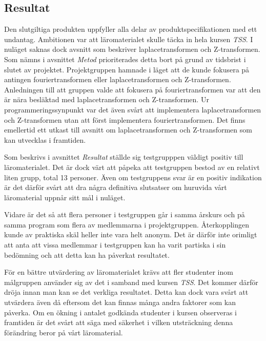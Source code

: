 \documentclass[]{article}
\begin{document}
\subsection{Resultat}
Den slutgiltiga produkten uppfyller alla delar av produktspecifikationen med ett undantag. Ambitionen var att
läromaterialet skulle täcka in hela kursen \textit{TSS}. I nuläget saknas dock avsnitt som beskriver laplacetransformen
och Z-transformen. Som nämns i avsnittet \textit{Metod} prioriterades detta bort på grund av tidsbrist i slutet av
projektet. Projektgruppen hamnade i läget att de kunde fokusera på antingen fouriertransformen eller laplacetransformen
och Z-transformen. Anledningen till att gruppen valde att fokusera på fouriertransformen var att den är nära besläktad
med laplacetransformen och Z-transformen.
Ur programmeringssynpunkt var det även svårt att implementera
laplacetransformen och Z-transformen utan att först implementera fouriertransformen. Det finns emellertid ett utkast
till avsnitt om laplacetransformen och Z-transformen som kan utvecklas i framtiden.

Som beskrivs i avsnittet \textit{Resultat} ställde sig testgrupppen väldigt positiv till läromaterialet.
Det är dock värt att påpeka att testgruppen bestod av en relativt liten grupp, total 13 personer.
Även om testgruppens svar är en positiv indikation är det därför svårt att dra några definitiva slutsatser om huruvida
vårt läromaterial uppnår sitt mål i nuläget.

Vidare är det så att flera personer i testgruppen går i samma årskurs och på samma program som flera av medlemmarna i
projektgruppen. Återkopplingen kunde av praktiska skäl heller inte vara helt anonym. Det är därför inte orimligt att
anta att vissa medlemmar i testgruppen kan ha varit partiska i sin bedömning och att detta kan ha påverkat resultatet.

För en bättre utvärdering av läromaterialet krävs att fler studenter inom målgruppen använder sig av det i samband med
kursen \textit{TSS}. Det kommer därför dröja innan man kan se det verkliga resultatet. Detta kan dock vara svårt att
utvärdera även då eftersom det kan finnas många andra faktorer som kan påverka. Om en ökning i antalet godkända
studenter i kursen observeras i framtiden är det svårt att säga med säkerhet i vilken utsträckning denna förändring
beror på vårt läromaterial.

\end{document}
